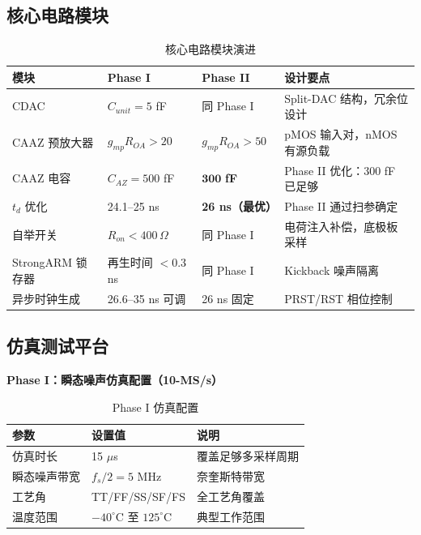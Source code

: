\documentclass[11pt,a4paper,UTF8]{ctexart}
\begin{document}
\subsection{核心电路模块}

\begin{table}[htbp]\centering\caption{核心电路模块演进}\label{tab:blocks}\small
\begin{tabular}{lp{2.2cm}p{2.2cm}p{3cm}}\toprule
\textbf{模块} & \textbf{Phase I} & \textbf{Phase II} & \textbf{设计要点} \\\midrule
CDAC & $C_{unit}=5$ fF & 同 Phase I & Split-DAC 结构，冗余位设计 \\
CAAZ 预放大器 & $g_{mp}R_{OA}>20$ & $g_{mp}R_{OA}>50$ & pMOS 输入对，nMOS 有源负载 \\
CAAZ 电容 & $C_{AZ}=500$ fF & $\mathbf{300}$ \textbf{fF} & Phase II 优化：300 fF 已足够 \\
$t_d$ 优化 & 24.1--25 ns & \textbf{26 ns（最优）} & Phase II 通过扫参确定 \\
自举开关 & $R_{on}<400\,\Omega$ & 同 Phase I & 电荷注入补偿，底极板采样 \\
StrongARM 锁存器 & 再生时间 $<$0.3 ns & 同 Phase I & Kickback 噪声隔离 \\
异步时钟生成 & 26.6--35 ns 可调 & 26 ns 固定 & PRST/RST 相位控制 \\\bottomrule
\end{tabular}
\end{table}

\subsection{仿真测试平台}

\textbf{Phase I：瞬态噪声仿真配置（10-MS/s）}

\begin{table}[htbp]\centering\caption{Phase I 仿真配置}\label{tab:sim1}\small
\begin{tabular}{lll}\toprule
\textbf{参数} & \textbf{设置值} & \textbf{说明} \\\midrule
仿真时长 & 15 $\mu$s & 覆盖足够多采样周期 \\
瞬态噪声带宽 & $f_s/2 = 5$ MHz & 奈奎斯特带宽 \\
工艺角 & TT/FF/SS/SF/FS & 全工艺角覆盖 \\
温度范围 & $-40^\circ$C 至 $125^\circ$C & 典型工作范围 \\\bottomrule
\end{tabular}
\end{table}
\end{document}
